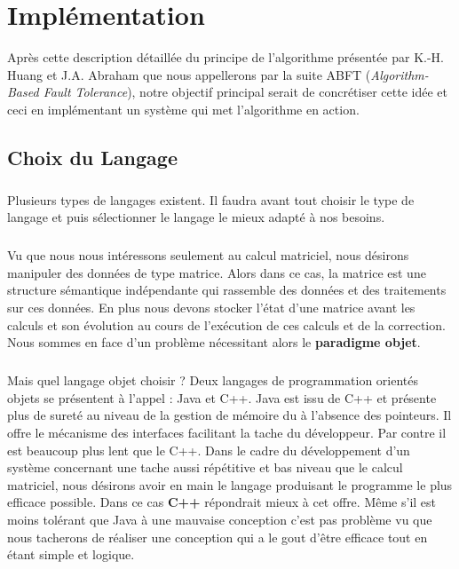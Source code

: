 \documentclass[a4paper, 10pt]{report}
\begin{document}
\chapter{Implémentation}
Après cette description détaillée du principe de l’algorithme présentée par K.-H. Huang et J.A. Abraham que nous 
appellerons par la suite ABFT (\textit{Algorithm-Based Fault Tolerance}), notre objectif principal serait de 
concrétiser cette idée et ceci en implémentant un système qui met l’algorithme en action.
\section{Choix du Langage}
\paragraph*{}
Plusieurs types de langages existent. Il faudra avant tout choisir le type de langage et puis sélectionner le langage 
le mieux adapté à nos besoins.
\paragraph*{}
Vu que nous nous intéressons seulement au calcul matriciel, nous désirons manipuler des données de type matrice. 
Alors dans ce cas, la matrice est une structure sémantique indépendante qui rassemble des données et des traitements 
sur ces données. En plus nous devons stocker l’état d’une matrice avant les calculs et son évolution au cours de 
l’exécution de ces calculs et de la correction. Nous sommes en face d’un problème nécessitant alors le \textbf{paradigme objet}.
\paragraph*{}
Mais quel langage objet choisir ? Deux langages de programmation orientés objets se présentent à l’appel : Java et C++. 
Java est issu de C++ et présente plus de sureté au niveau de la gestion de mémoire du à l’absence des pointeurs. 
Il offre le mécanisme des interfaces facilitant la tache du développeur. Par contre il est beaucoup plus lent que le C++. 
Dans le cadre du développement d’un système concernant une tache aussi répétitive et bas niveau que le calcul matriciel, 
nous désirons avoir en main le langage produisant le programme le plus efficace possible. Dans ce cas \textbf{C++} répondrait mieux 
à cet offre. Même s’il est moins tolérant que Java à une mauvaise conception c'est pas problème vu que nous tacherons de réaliser 
une conception qui a le gout d’être efficace tout en étant simple et logique.
\end{document}
